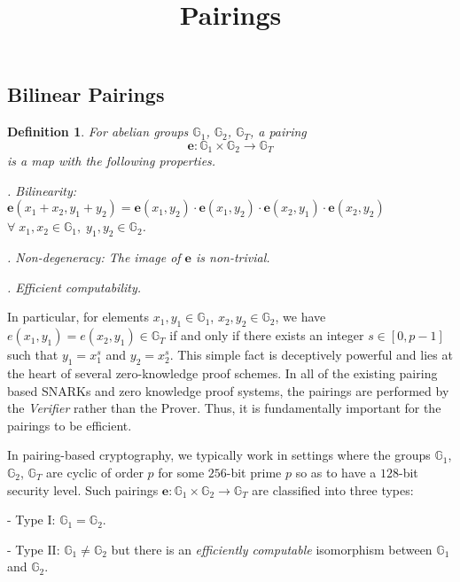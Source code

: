 \documentclass[11pt, lettersize, notitlepage, leqno, footskip=0.6cm]{article}
\newcommand{\lra}{\longrightarrow}
\newcommand{\mb}{\mathbb}
\newcommand{\mr}{\mathrm}
\newtheorem{Def}{Definition}[section]
\numberwithin{equation}{section}
\begin{document}
 
\title{Pairings}
\author{}
\date{}
 
\maketitle

\subsection{\fontsize{11}{11}\selectfont Bilinear Pairings}





\begin{Def} \normalfont For abelian groups $\mb{G}_1$, $\mb{G}_2$, $\mb{G}_T$, a \textit{pairing} $$\mathbf{e}:\mb{G}_1\times \mb{G}_2 \lra \mb{G}_T$$ is a map with the following properties.

. Bilinearity: $\mathbf{e}(x_1+x_2,y_1+y_2) = \mathbf{e}(x_1, y_2)\cdot\mathbf{e}(x_1, y_2)\cdot\mathbf{e}(x_2, y_1)\cdot\mathbf{e}(x_2, y_2)$\\ $\forall\; x_1,x_2\in \mb{G}_1,\; y_1,y_2\in \mb{G}_2$.

. Non-degeneracy: The image of $\mathbf{e}$ is non-trivial.

. Efficient computability.\end{Def}

In particular, for elements $x_1,y_1\in \mb{G}_1$, $x_2,y_2\in \mb{G}_2$, we have $ e(x_1,y_1) = e(x_2,y_1)\in \mb{G}_T$ if and only if there exists an integer $s\in [0,p-1]$ such that $y_1 = x_1^s$ and $y_2 = x_2^s$. This simple fact is deceptively powerful and lies at the heart of several zero-knowledge proof schemes. In all of the existing pairing based SNARKs and zero knowledge proof systems, the pairings are performed by the \textit{Verifier} rather than the Prover. Thus, it is fundamentally important for the pairings to be efficient. 

In pairing-based cryptography, we typically work in settings where the groups $\mb{G}_1$, $\mb{G}_2$, $\mb{G}_T$ are cyclic of order $p$ for some $256$-bit prime $p$ so as to have a $128$-bit security level. Such pairings $\mathbf{e}:\mb{G}_1\times \mb{G}_2 \lra \mb{G}_T$ are classified into three types:

\noindent - Type $\mr{I}$: $\mb{G}_1 = \mb{G}_2$.

\noindent - Type $\mr{II}$: $\mb{G}_1 \neq \mb{G}_2$ but there is an \textit{efficiently computable} isomorphism between $\mb{G}_1$ and $\mb{G}_2$.
\end{document}

